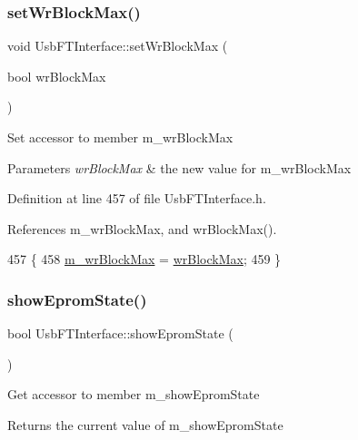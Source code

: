 \subsubsection{\texorpdfstring{set\+Wr\+Block\+Max()}{setWrBlockMax()}}
{\footnotesize\ttfamily void Usb\+F\+T\+Interface\+::set\+Wr\+Block\+Max (\begin{DoxyParamCaption}\item[{bool}]{wr\+Block\+Max }\end{DoxyParamCaption})\hspace{0.3cm}{\ttfamily [inline]}}

Set accessor to member m\+\_\+wr\+Block\+Max 
\begin{DoxyParams}{Parameters}
{\em wr\+Block\+Max} & the new value for m\+\_\+wr\+Block\+Max \\
\hline
\end{DoxyParams}


Definition at line 457 of file Usb\+F\+T\+Interface.\+h.



References m\+\_\+wr\+Block\+Max, and wr\+Block\+Max().


\begin{DoxyCode}
457                                        \{
458     \hyperlink{classUsbFTInterface_ad0512841c67ea39da7701e990628059a}{m\_wrBlockMax} = \hyperlink{classUsbFTInterface_ad73d2d990fdda96ee53566daaeb73abc}{wrBlockMax};
459   \}
\end{DoxyCode}
\mbox{\label{classUsbFTInterface_a6e9b97244aaac289792fbef24daad33e}} 
\subsubsection{\texorpdfstring{show\+Eprom\+State()}{showEpromState()}}
{\footnotesize\ttfamily bool Usb\+F\+T\+Interface\+::show\+Eprom\+State (\begin{DoxyParamCaption}{ }\end{DoxyParamCaption})\hspace{0.3cm}{\ttfamily [inline]}}

Get accessor to member m\+\_\+show\+Eprom\+State \begin{DoxyReturn}{Returns}
the current value of m\+\_\+show\+Eprom\+State 
\end{DoxyReturn}


